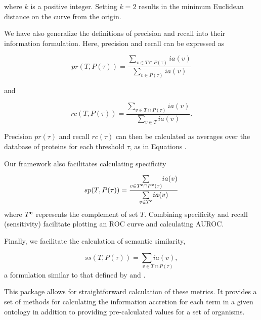 \documentclass{article}
\begin{document}
\noindent where $k$ is a positive integer. Setting $k=2$ results in the minimum Euclidean distance on the curve from the origin.
 
We have also generalize the definitions of precision and recall into their information formulation. Here, precision and recall can be expressed as

\begin{equation}
pr(T,P(\tau))=\frac{\underset{v\in T\cap P(\tau)}{\sum}ia(v)}{\underset{v\in P(\tau)}{\sum}ia(v)}
\label{eq:precision}
\end{equation}

\noindent and

\begin{equation}
rc(T,P(\tau))=\frac{\underset{v\in T\cap P(\tau)}{\sum}ia(v)}{\underset{v\in T}{\sum}ia(v)}.
\label{eq:recall}
\end{equation}

Precision $pr(\tau)$ and recall $rc(\tau)$ can then be calculated as averages over the database of proteins for each threshold $\tau$, as in Equations .

Our framework also facilitates calculating specificity

\begin{equation}
sp(T,P(\tau))=\frac{\underset{v\in T^{\bf{c}} \cap P^{\bf{c}}(\tau)}{\sum}ia(v)}{\underset{v\in T^{\bf{c}}}{\sum}ia(v)}
\label{eq:weighted_specificity}
\end{equation}
where $T^{\bf{c}}$ represents the complement of set $T$. Combining specificity and recall (sensitivity) facilitate plotting an ROC curve and calculating AUROC.

Finally, we facilitate the calculation of semantic similarity,

\begin{equation}
ss(T,P(\tau))=\underset{v\in T\cap P(\tau)}{\sum{ia(v)}},
\label{eq:semsem}
\end{equation}
a formulation similar to that defined by \citet{Resnik1995} and \citet{Lord2003}.

This package allows for straightforward calculation of these metrics. It provides a set of methods for calculating the information accretion for each term in a given ontology in addition to providing pre-calculated values for a set of organisms.
\end{document}
